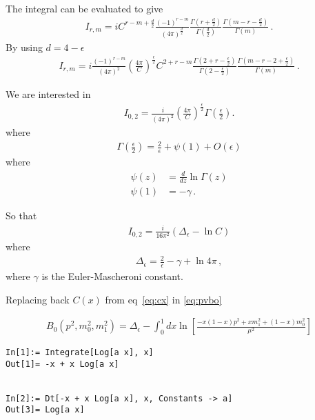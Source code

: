 The integral can be evaluated to give
\begin{align}
  I_{r, m}=i C^{r-m+\frac{d}{2}} \frac{(-1)^{r-m}}{(4 \pi)^{\frac{d}{2}}} \frac{\Gamma\left(r+\frac{d}{2}\right)}{\Gamma\left(\frac{d}{2}\right)} \frac{\Gamma\left(m-r-\frac{d}{2}\right)}{\Gamma(m)}\,.
\end{align}
By using $d=4-\epsilon$
\begin{align}
  I_{r, m}=i \frac{(-1)^{r-m}}{(4 \pi)^{2}}\left(\frac{4 \pi}{C}\right)^{\frac{\epsilon}{2}} C^{2+r-m} \frac{\Gamma\left(2+r-\frac{\epsilon}{2}\right)}{\Gamma\left(2-\frac{\epsilon}{2}\right)} \frac{\Gamma\left(m-r-2+\frac{\epsilon}{2}\right)}{\Gamma(m)}\,.
\end{align}

We are interested in
\begin{align}
  I_{0,2}=\frac{i}{(4 \pi)^{2}}\left(\frac{4 \pi}{C}\right)^{\frac{\epsilon}{2}} \Gamma\left(\frac{\epsilon}{2}\right).
\end{align}
where
\begin{align}
  \Gamma\left(\frac{\epsilon}{2}\right)=\frac{2}{\epsilon}+\psi(1)+O(\epsilon)
\end{align}
where
\begin{align}
\psi(z) &=\frac{d}{d z} \ln \Gamma(z) \\ \psi(1) &=-\gamma \,.
\end{align}

So that
\begin{align}
  I_{0,2}=\frac{i}{16 \pi^{2}}\left(\Delta_{\epsilon}-\ln C\right)
\end{align}
where
\begin{align}
  \Delta_{\epsilon}=\frac{2}{\epsilon}-\gamma+\ln 4 \pi\,,
\end{align}
where $\gamma$ is the Euler-Mascheroni constant.


Replacing back $C(x)$ from eq~\eqref{eq:cx} in \eqref{eq:pvbo}

\begin{align}
  \label{eq:gpvbo}
  B_{0}\left(p^{2}, m_{0}^{2}, m_{1}^{2}\right)=\Delta_{\epsilon}-\int_{0}^{1} d x \ln \left[\frac{-x(1-x) p^{2}+x m_{1}^{2}+(1-x) m_{0}^{2}}{\mu^{2}}\right]
\end{align}

\begin{verbatim}
In[1]:= Integrate[Log[a x], x]
Out[1]= -x + x Log[a x]


In[2]:= Dt[-x + x Log[a x], x, Constants -> a]
Out[3]= Log[a x]
\end{verbatim}


